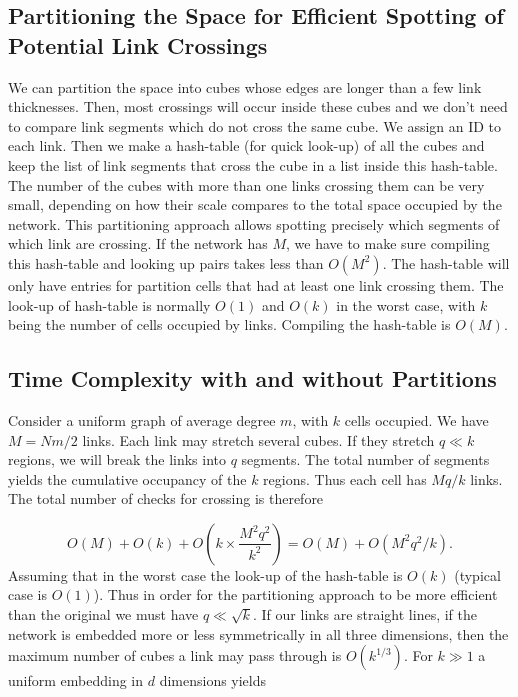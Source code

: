\documentclass[endfloats,nofootinbib,preprint,floatfix,titlepage,superscriptaddress,linenumbers]{revtex4-1} %
\begin{document}
\subsection{ Partitioning the Space for Efficient Spotting of Potential Link Crossings}
We can partition the space into cubes whose edges are longer than a few link thicknesses. 
Then, most crossings will occur inside these cubes and we don't need to compare link segments which do not cross the same cube. 
We assign an ID to each link. 
Then we make a hash-table (for quick look-up) of all the cubes and keep the list of link segments that cross the cube in a list inside this hash-table. %
The number of the cubes with more than one links crossing them can be very small, depending on how their scale compares to the total space occupied by the network. 
This partitioning approach allows spotting precisely which segments of which link are crossing. 
If the network has $M$, we have to make sure compiling this hash-table and looking up pairs takes less than $O(M^2)$. 
The hash-table will only have entries for partition cells that had at least one link crossing them. 
The look-up of hash-table is normally $O(1)$ and $O(k)$ in the worst case, with $k$ being the number of cells occupied by links.  
Compiling the hash-table is $O(M)$. 


\subsection{Time Complexity with and without Partitions\label{ap:complexity}}
Consider a uniform graph of average degree $m$, with $k$ cells occupied. We have $M = Nm/2$ links. Each link may stretch several cubes. If they stretch $q \ll k $ regions, we will break the links into $q$ segments. The total number of segments yields the cumulative occupancy of the $k$ regions. Thus each cell has $Mq/k$ links. 
The total number of checks for crossing is therefore

$$ O(M) + O(k)+ O\left( k \times \frac{M^2 q^2 }{ k^2} \right)= O(M)+ O(M^2 q^2/k). $$
Assuming that in the worst case the look-up of the hash-table is $O(k)$ (typical case is $O(1)$). Thus in order for the partitioning approach to be more efficient than the original we must have $q \ll \sqrt{k}$. If our links are straight lines, if the network is embedded more or less symmetrically in all three dimensions, then the maximum number of cubes a link may pass through is $O(k^{1/3})$. For $k \gg 1$ a uniform embedding in $d$ dimensions yields 
\end{document}
